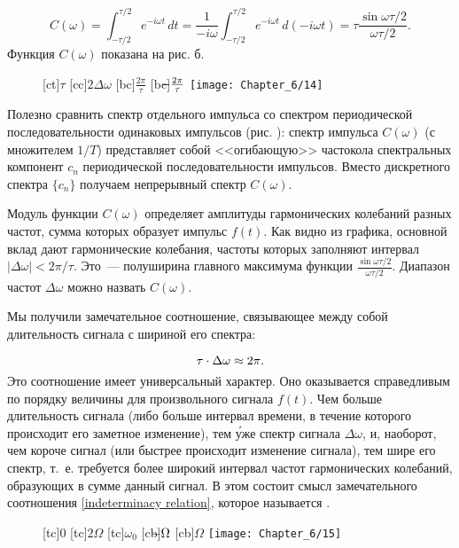 \begin{equation*}
	C(\omega)=\int_{-\tau/2}^{\tau/2} e^{-i\omega t}\,dt=\frac{1}{-i\omega}\int_{-\tau/2}^{\tau/2} e^{-i\omega t}\,
d(-i\omega t)=\tau\frac{\sin\omega\tau/2}{\omega\tau/2}.
\end{equation*}
Функция $C(\omega)$ показана на рис. б.
\begin{figure}[h!]
	[ct]{$\tau$}
	[cc]{$2\Delta\omega$}
	[bc]{$\frac{2\pi}{\tau}$}
	[bc]{$\llap{$-$}\frac{2\pi}{\tau}$}
	\texttt{[image: Chapter\_6/14]}
	\caption{}
\end{figure}

Полезно сравнить спектр отдельного импульса со спектром периодической последовательности одинаковых импульсов (рис. ):
спектр импульса $C(\omega)$ (с множителем $1/T$) представляет собой <<огибающую>> частокола спектральных компонент $c_n$
периодической последовательности импульсов. Вместо дискретного спектра $\{c_n\}$ получаем непрерывный спектр $C(\omega)$.

Модуль функции $C(\omega)$ определяет амплитуды гармонических колебаний разных частот, сумма которых образует импульс
$f(t)$. Как видно из графика, основной вклад дают гармонические колебания, частоты которых заполняют интервал
$|\Delta\omega|<2\pi/\tau$. Это~--- полуширина главного максимума функции
$\frac{\sin\omega\tau/2}{\omega\tau/2}$. Диапазон частот $\Delta\omega$ можно назвать  $C(\omega)$.

Мы получили замечательное соотношение, связывающее между собой длительность сигнала с шириной его спектра:

\begin{equation}
	\eqmark{indeterminacy relation}
\tau \cdot \Delta\omega \approx 2\pi.
\end{equation}
Это соотношение имеет универсальный характер. Оно оказывается справедливым по порядку величины для произвольного сигнала
$f(t)$. Чем больше длительность сигнала (либо больше интервал времени, в течение которого происходит его заметное
изменение), тем \'уже спектр сигнала $\Delta\omega$, и, наоборот, чем короче сигнал (или быстрее происходит изменение
сигнала), тем шире его спектр, т.~е. требуется более широкий интервал частот гармонических колебаний, образующих в сумме
данный сигнал. В этом состоит смысл замечательного соотношения \eqref{indeterminacy relation}, которое называется .
\begin{figure}[h!]
	[tc]{0}
	[tc]{$2\Omega$}
	[tc]{$\omega_0$}
	[cb]{$\llap{$-$}\Omega$}
	[cb]{$\Omega$}
	\texttt{[image: Chapter\_6/15]}
	\caption{}
\end{figure}

